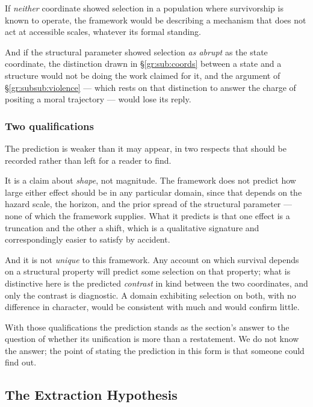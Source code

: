\documentclass[11pt]{article}
\numberwithin{equation}{section}
\theoremstyle{plain}
\theoremstyle{definition}
\theoremstyle{remark}
\begin{document}
If \emph{neither} coordinate showed selection in a population where
survivorship is known to operate, the framework would be describing a
mechanism that does not act at accessible scales, whatever its formal
standing.

And if the structural parameter showed selection \emph{as abrupt} as
the state coordinate, the distinction drawn in
\S\ref{gr:sub:coords} between a state and a structure would not be doing
the work claimed for it, and the argument of
\S\ref{gr:subsub:violence} --- which rests on that distinction to answer
the charge of positing a moral trajectory --- would lose its reply.

\subsubsection{Two qualifications}
\label{gr:subsub:crossqual}

The prediction is weaker than it may appear, in two respects that should
be recorded rather than left for a reader to find.

It is a claim about \emph{shape}, not magnitude. The framework does not
predict how large either effect should be in any particular domain,
since that depends on the hazard scale, the horizon, and the prior
spread of the structural parameter --- none of which the framework
supplies. What it predicts is that one effect is a truncation and the
other a shift, which is a qualitative signature and correspondingly
easier to satisfy by accident.

And it is not \emph{unique} to this framework. Any account on which
survival depends on a structural property will predict some selection on
that property; what is distinctive here is the predicted \emph{contrast}
in kind between the two coordinates, and only the contrast is
diagnostic. A domain exhibiting selection on both, with no difference in
character, would be consistent with much and would confirm little.

With those qualifications the prediction stands as the section's answer
to the question of whether its unification is more than a restatement.
We do not know the answer; the point of stating the prediction in this
form is that someone could find out.

\subsection{The Extraction Hypothesis}\label{gr:sub:extraction}
\end{document}
